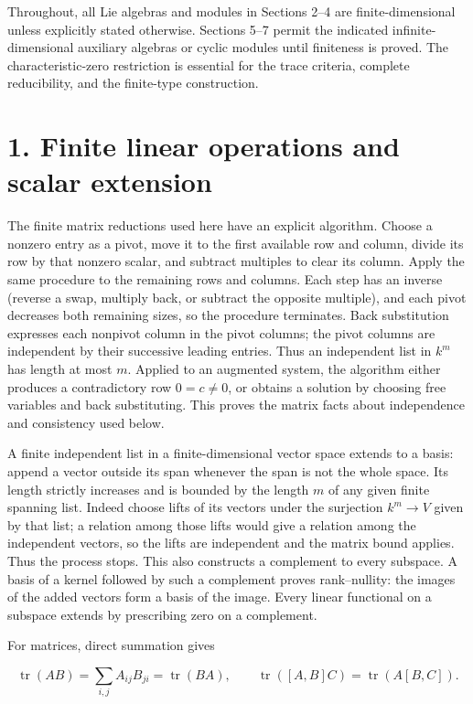 \documentclass[11pt,a4paper,openany]{report}
\begin{document}
Throughout, all Lie algebras and modules in Sections 2--4 are finite-dimensional unless explicitly stated otherwise. Sections 5--7 permit the indicated infinite-dimensional auxiliary algebras or cyclic modules until finiteness is proved. The characteristic-zero restriction is essential for the trace criteria, complete reducibility, and the finite-type construction.

\section{1. Finite linear operations and scalar extension}\label{AG-RG-S06-finite-linear-operations-and-scalar-extension}

The finite matrix reductions used here have an explicit algorithm. Choose a nonzero entry as a pivot, move it to the first available row and column, divide its row by that nonzero scalar, and subtract multiples to clear its column. Apply the same procedure to the remaining rows and columns. Each step has an inverse (reverse a swap, multiply back, or subtract the opposite multiple), and each pivot decreases both remaining sizes, so the procedure terminates. Back substitution expresses each nonpivot column in the pivot columns; the pivot columns are independent by their successive leading entries. Thus an independent list in \(k^m\) has length at most \(m\). Applied to an augmented system, the algorithm either produces a contradictory row \(0=c\ne0\), or obtains a solution by choosing free variables and back substituting. This proves the matrix facts about independence and consistency used below.

A finite independent list in a finite-dimensional vector space extends to a basis: append a vector outside its span whenever the span is not the whole space. Its length strictly increases and is bounded by the length \(m\) of any given finite spanning list. Indeed choose lifts of its vectors under the surjection \(k^m\to V\) given by that list; a relation among those lifts would give a relation among the independent vectors, so the lifts are independent and the matrix bound applies. Thus the process stops. This also constructs a complement to every subspace. A basis of a kernel followed by such a complement proves rank--nullity: the images of the added vectors form a basis of the image. Every linear functional on a subspace extends by prescribing zero on a complement.

For matrices, direct summation gives

\[
\operatorname{tr}(AB)=\sum_{i,j}A_{ij}B_{ji}
=\operatorname{tr}(BA),\qquad
\operatorname{tr}([A,B]C)=\operatorname{tr}(A[B,C]).
\tag{1.1}
\]
\end{document}
